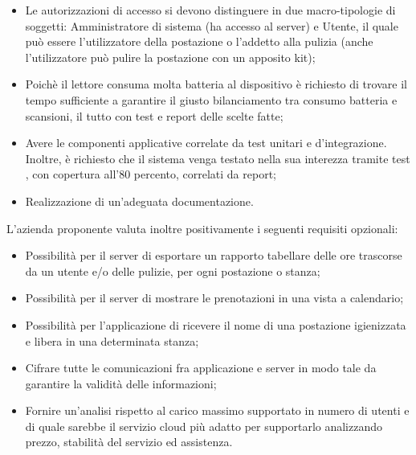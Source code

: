 \begin{itemize}
\item Le autorizzazioni di accesso si devono distinguere in due macro-tipologie di soggetti: Amministratore di sistema (ha accesso al server) e Utente, il quale può essere l'utilizzatore della postazione o l'addetto alla pulizia (anche l'utilizzatore può pulire la postazione con un apposito kit);
\item Poichè il lettore  consuma molta batteria al dispositivo è richiesto di trovare il tempo sufficiente a garantire il giusto bilanciamento tra consumo batteria e scansioni, il tutto con test e report delle scelte fatte;
\item Avere le componenti applicative correlate da test unitari e d’integrazione. Inoltre, è richiesto che il sistema venga testato nella sua interezza tramite test , con copertura all'80 percento, correlati da report;
\item Realizzazione di un'adeguata documentazione.
\end{itemize}

L’azienda proponente valuta inoltre positivamente i seguenti requisiti opzionali:
\begin{itemize}    
\item Possibilità per il server di esportare un rapporto tabellare delle ore trascorse da un utente e/o delle pulizie, per ogni postazione o stanza;
\item Possibilità per il server di mostrare le prenotazioni in una vista a calendario;
\item Possibilità per l'applicazione di ricevere il nome di una postazione igienizzata e libera in una determinata stanza; 
\item Cifrare tutte le comunicazioni fra applicazione e server in modo tale da garantire la validità delle informazioni;
\item Fornire un’analisi rispetto al carico massimo supportato in numero di utenti e di quale sarebbe il servizio cloud più adatto per supportarlo analizzando prezzo, stabilità  del servizio ed assistenza.
\end{itemize}

